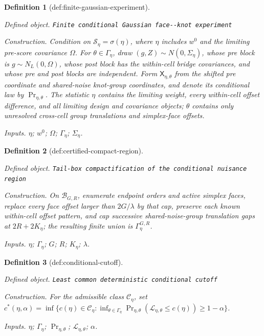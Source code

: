 \documentclass{article}
\newtheorem{definition}{Definition}
\begin{document}
\begin{definition}[def:finite-gaussian-experiment]\label{def:finite-gaussian-experiment}
\par\smallskip\noindent\emph{Defined object.} \texttt{Finite conditional Gaussian face-\allowbreak{}-\allowbreak{}knot experiment}
\par\smallskip\noindent\emph{Construction.} Condition on \(\mathscr S_\eta=\sigma(\eta)\), where \(\eta\) includes \(w^0\) and the limiting pre-score covariance \(\Omega\).  For \(\theta\in\Gamma_\eta\), draw \((g,Z)\sim N(0,\Sigma_\eta)\), whose pre block is \(g\sim N_L(0,\Omega)\), whose post block has the within-cell bridge covariances, and whose pre and post blocks are independent.  Form \(\mathsf X_{\eta,\theta}\) from the shifted pre coordinate and shared-noise knot-group coordinates, and denote its conditional law by \(\Pr_{\eta,\theta}\).  The statistic \(\eta\) contains the limiting weight, every within-cell offset difference, and all limiting design and covariance objects; \(\theta\) contains only unresolved cross-cell group translations and simplex-face offsets.
\par\smallskip\noindent\emph{Inputs.} \(\eta\); \(w^0\); \(\Omega\); \(\Gamma_\eta\); \(\Sigma_\eta\).
\end{definition}

\begin{definition}[def:certified-compact-region]\label{def:certified-compact-region}
\par\smallskip\noindent\emph{Defined object.} \texttt{Tail-\allowbreak{}box compactification of the conditional nuisance region}
\par\smallskip\noindent\emph{Construction.} On \(\mathcal B_{G,R}\), enumerate endpoint orders and active simplex faces, replace every face offset larger than \(2G/\lambda\) by that cap, preserve each known within-cell offset pattern, and cap successive shared-noise-group translation gaps at \(2R+2K_\eta\); the resulting finite union is \(\Gamma_\eta^{G,R}\).
\par\smallskip\noindent\emph{Inputs.} \(\eta\); \(\Gamma_\eta\); \(G\); \(R\); \(K_\eta\); \(\lambda\).
\end{definition}

\begin{definition}[def:conditional-cutoff]\label{def:conditional-cutoff}
\par\smallskip\noindent\emph{Defined object.} \texttt{Least common deterministic conditional cutoff}
\par\smallskip\noindent\emph{Construction.} For the admissible class \(\mathscr C_\eta\), set \(c^*(\eta,\alpha)=\inf\{c(\eta)\in\mathscr C_\eta:\inf_{\theta\in\Gamma_\eta}\Pr_{\eta,\theta}(\mathcal L_{\eta,\theta}\leq c(\eta))\geq1-\alpha\}\).
\par\smallskip\noindent\emph{Inputs.} \(\eta\); \(\Gamma_\eta\); \(\Pr_{\eta,\theta}\); \(\mathcal L_{\eta,\theta}\); \(\alpha\).
\end{definition}
\end{document}
